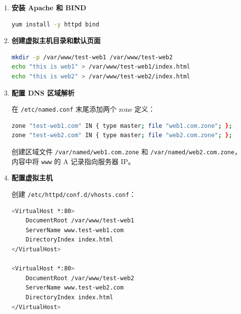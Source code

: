 \documentclass[12pt,a4paper]{ctexart}
\begin{document}
\begin{enumerate}[label=\arabic*.,leftmargin=*]

  \item \textbf{安装 Apache 和 BIND}

  \begin{cmdbox}
  \begin{lstlisting}[language=bash]
yum install -y httpd bind
  \end{lstlisting}
  \end{cmdbox}

  \item \textbf{创建虚拟主机目录和默认页面}

  \begin{cmdbox}
  \begin{lstlisting}[language=bash]
mkdir -p /var/www/test-web1 /var/www/test-web2
echo "this is web1" > /var/www/test-web1/index.html
echo "this is web2" > /var/www/test-web2/index.html
  \end{lstlisting}
  \end{cmdbox}

  \item \textbf{配置 DNS 区域解析}

  在 \texttt{/etc/named.conf} 末尾添加两个 zone 定义：

  \begin{cmdbox}
  \small
  \begin{lstlisting}[language=bash]
zone "test-web1.com" IN { type master; file "web1.com.zone"; };
zone "test-web2.com" IN { type master; file "web2.com.zone"; };
  \end{lstlisting}
  \end{cmdbox}

  创建区域文件 \texttt{/var/named/web1.com.zone} 和 \texttt{/var/named/web2.com.zone}，内容中将
  \texttt{www} 的 A 记录指向服务器 IP。

  \item \textbf{配置虚拟主机}

  创建 \texttt{/etc/httpd/conf.d/vhosts.conf}：

  \begin{cmdbox}
  \small
  \begin{lstlisting}[language=bash]
<VirtualHost *:80>
    DocumentRoot /var/www/test-web1
    ServerName www.test-web1.com
    DirectoryIndex index.html
</VirtualHost>

<VirtualHost *:80>
    DocumentRoot /var/www/test-web2
    ServerName www.test-web2.com
    DirectoryIndex index.html
</VirtualHost>
  \end{lstlisting}
  \end{cmdbox}


\end{enumerate}
\end{document}
